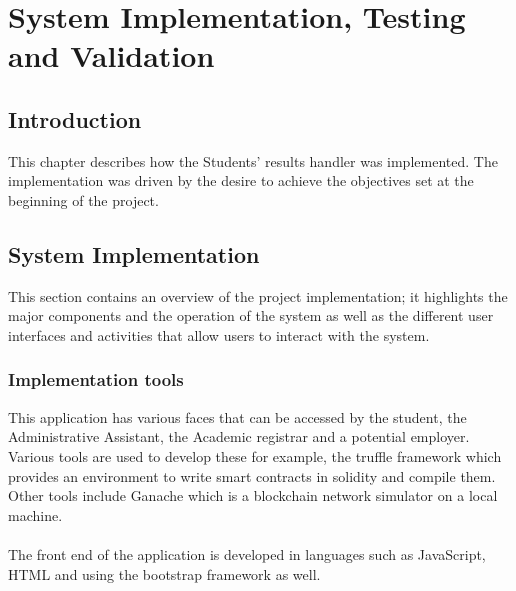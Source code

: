 \chapter{System Implementation, Testing and Validation}
\section{Introduction}
This chapter describes how the Students’ results handler was implemented. The implementation was driven by the desire to achieve the objectives set at the beginning of the project.

\section{System Implementation}
This section contains an overview of the project implementation; it highlights the major components and the operation of the system as well as the different user interfaces and activities that allow users to interact with the system.

\subsection{Implementation tools}
This application has various faces that can be accessed by the student, the Administrative Assistant, the Academic registrar and a potential employer. Various tools are used to develop these for example, the truffle framework which provides an environment to write smart contracts in solidity and compile them. Other tools include Ganache which is a blockchain network simulator on a local machine.\\~\\
The front end of the application is developed in languages such as JavaScript, HTML and using the bootstrap framework as well.


